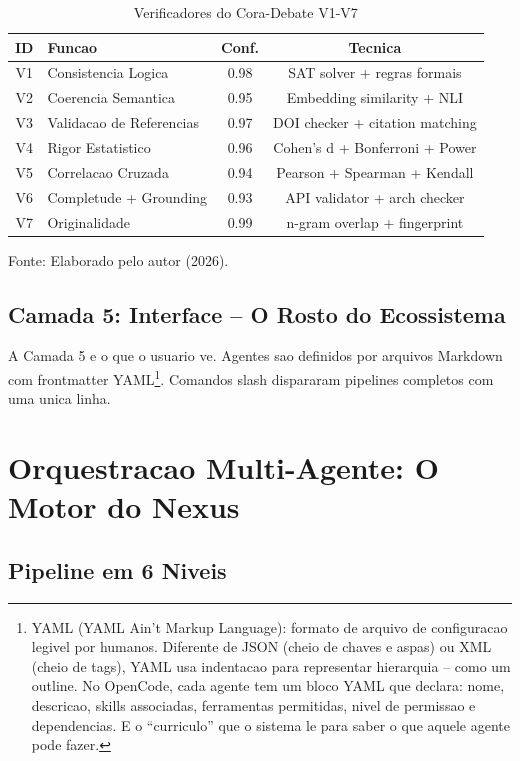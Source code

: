 \documentclass[12pt,a4paper,oneside,sumario=tradicional,chapter=TITLE,section=TITLE,subsection=TITLE,english,brazil]{abntex2}
\begin{document}
\begin{table}[H]\centering\caption{Verificadores do Cora-Debate V1-V7}\label{tab:cora}
\begin{tabular}{clcc}\toprule\textbf{ID} & \textbf{Funcao} & \textbf{Conf.} & \textbf{Tecnica} \\\midrule
V1 & Consistencia Logica & 0.98 & SAT solver + regras formais \\
V2 & Coerencia Semantica & 0.95 & Embedding similarity + NLI \\
V3 & Validacao de Referencias & 0.97 & DOI checker + citation matching \\
V4 & Rigor Estatistico & 0.96 & Cohen's d + Bonferroni + Power \\
V5 & Correlacao Cruzada & 0.94 & Pearson + Spearman + Kendall \\
V6 & Completude + Grounding & 0.93 & API validator + arch checker \\
V7 & Originalidade & 0.99 & n-gram overlap + fingerprint \\\bottomrule
\end{tabular}
\small\vspace{2pt}Fonte: Elaborado pelo autor (2026).\smallskip
\end{table}

\subsection{Camada 5: Interface -- O Rosto do Ecossistema}

A Camada 5 e o que o usuario ve. Agentes sao definidos por arquivos Markdown com frontmatter YAML\footnote{YAML (YAML Ain't Markup Language): formato de arquivo de configuracao legivel por humanos. Diferente de JSON (cheio de chaves e aspas) ou XML (cheio de tags), YAML usa indentacao para representar hierarquia -- como um outline. No OpenCode, cada agente tem um bloco YAML que declara: nome, descricao, skills associadas, ferramentas permitidas, nivel de permissao e dependencias. E o ``curriculo'' que o sistema le para saber o que aquele agente pode fazer.}. Comandos slash dispararam pipelines completos com uma unica linha.

\section{Orquestracao Multi-Agente: O Motor do Nexus}

\subsection{Pipeline em 6 Niveis}
\end{document}
